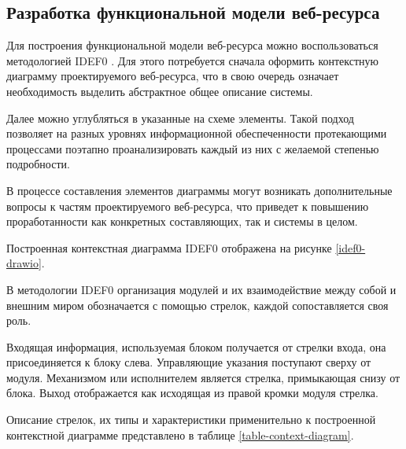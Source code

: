 \subsection{Разработка функциональной модели веб-ресурса}

Для построения функциональной модели веб-ресурса можно воспользоваться методологией IDEF0 \cite{wiki-idef0}.
Для этого потребуется сначала оформить контекстную диаграмму проектируемого веб-ресурса, что в свою очередь означает необходимость выделить абстрактное общее описание системы.

Далее можно углубляться в указанные на схеме элементы.
Такой подход позволяет на разных уровнях информационной обеспеченности протекающими процессами поэтапно проанализировать каждый из них с желаемой степенью подробности.

В процессе составления элементов диаграммы могут возникать дополнительные вопросы к частям проектируемого веб-ресурса, что приведет к повышению проработанности как конкретных составляющих, так и системы в целом.

Построенная контекстная диаграмма IDEF0 отображена на рисунке \ref{idef0-drawio}.

В методологии IDEF0 организация модулей и их взаимодействие между собой и внешним миром обозначается с помощью стрелок, каждой сопоставляется своя роль.

Входящая информация, используемая блоком получается от стрелки входа, она присоединяется к блоку слева.
Управляющие указания поступают сверху от модуля.
Механизмом или исполнителем является стрелка, примыкающая снизу от блока.
Выход отображается как исходящая из правой кромки модуля стрелка.

Описание стрелок, их типы и характеристики применительно к построенной контекстной диаграмме представлено в таблице \ref{table-context-diagram}.

